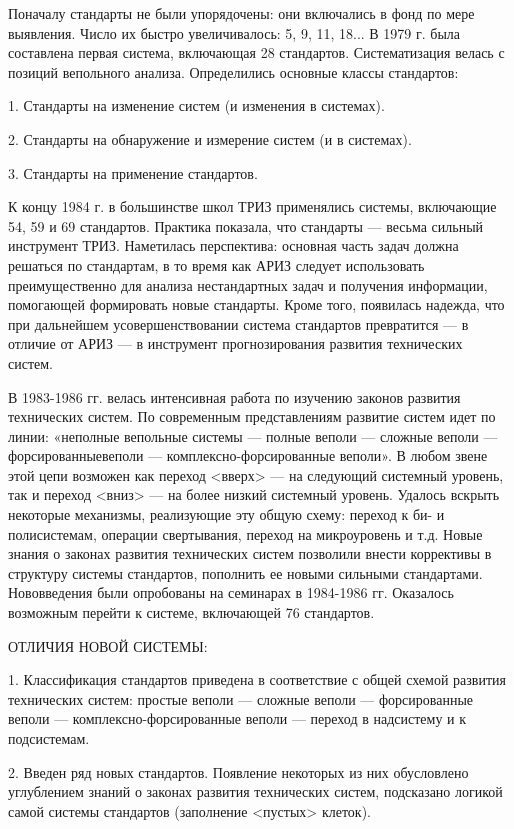 Поначалу  стандарты не  были  упорядочены: они  включались  в фонд  по
мере  выявления. Число  их быстро  увеличивалось:  5, 9,  11, 18...  В
1979  г. была  составлена  первая система,  включающая 28  стандартов.
Систематизация  велась  с  позиций  вепольного  анализа.  Определились
основные классы стандартов:

1. Стандарты на изменение систем (и изменения в системах).

2. Стандарты на обнаружение и измерение систем (и в системах).

3. Стандарты на применение стандартов.

К  концу  1984  г.  в   большинстве  школ  ТРИЗ  применялись  системы,
включающие 54, 59 и 69  стандартов. Практика показала, что стандарты —
весьма  сильный  инструмент  ТРИЗ.  Наметилась  перспектива:  основная
часть  задач  должна решаться  по  стандартам,  в  то время  как  АРИЗ
следует использовать  преимущественно для анализа  нестандартных задач
и  получения  информации,   помогающей  формировать  новые  стандарты.
Кроме того,  появилась надежда, что при  дальнейшем усовершенствовании
система  стандартов превратится  — в  отличие от  АРИЗ —  в инструмент
прогнозирования развития технических систем.

В 1983-1986 гг. велась интенсивная работа по изучению законов развития
технических систем. По современным представлениям развитие систем идет
по линии: «неполные вепольные системы — полные веполи — сложные веполи
—  форсированныевеполи  —  комплексно-форсированные веполи».  В  любом
звене этой цепи возможен как  переход <вверх> — на следующий системный
уровень, так  и переход  <вниз> — на  более низкий  системный уровень.
Удалось  вскрыть некоторые  механизмы,  реализующие  эту общую  схему:
переход  к  би-  и  полисистемам,  операции  свертывания,  переход  на
микроуровень и т.д. Новые знания о законах развития технических систем
позволили внести коррективы в  структуру системы стандартов, пополнить
ее  новыми  сильными  стандартами.  Нововведения  были  опробованы  на
семинарах  в  1984-1986 гг.  Оказалось  возможным  перейти к  системе,
включающей 76 стандартов.

ОТЛИЧИЯ НОВОЙ СИСТЕМЫ:

1. Классификация  стандартов приведена  в соответствие с  общей схемой
развития  технических  систем:  простые  веполи  —  сложные  веполи  —
форсированные  веполи —  комплексно-форсированные веполи  — переход  в
надсистему и к подсистемам.

2. Введен ряд новых стандартов. Появление некоторых из них обусловлено
углублением знаний  о законах развития технических  систем, подсказано
логикой самой системы стандартов (заполнение <пустых> клеток).

